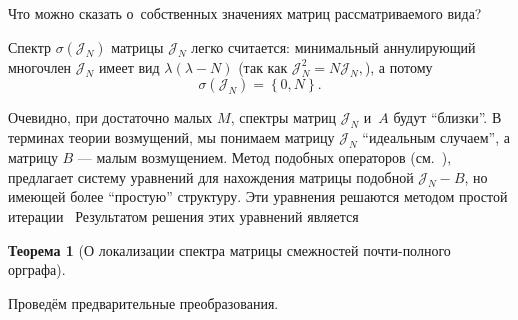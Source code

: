 \documentclass[14pt,a4paper]{extarticle}
\numberwithin{equation}{section}
\newtheorem{thm}{Теорема}
\theoremstyle{definition}
\begin{document}
Что можно сказать о~собственных значениях матриц рассматриваемого вида?

Спектр \( \sigma\left( \mathcal{J}_N \right) \)
 матрицы \( \mathcal{J}_N \) легко считается: минимальный аннулирующий
 многочлен \( \mathcal{J}_N \) имеет вид \( \lambda(\lambda - N) \) (так как \(
 \mathcal{J}_N^2 = N \mathcal{J}_N, \)), а потому
 \[ \sigma\left( \mathcal{J}_N \right) = \left\{ 0,N \right\}. \]

Очевидно, при достаточно малых \( M \),
спектры матриц \( \mathcal{J}_N \) и~\( A \) будут ``близки''.
В терминах теории возмущений, мы понимаем матрицу \( \mathcal{J}_N \)
``идеальным случаем'', а матрицу \( B \) --- малым возмущением.
Метод подобных операторов (см.~\cite{baskakov1986theorem,baskakov1987theorem,baskakov1994spectral,baskakov2002splitting}),
предлагает систему уравнений для нахождения матрицы подобной \( \mathcal{J}_N -
B \), но имеющей более ``простую'' структуру. Эти уравнения решаются методом
простой итерации~\cite{baskakov1986theorem,baskakov1987theorem,baskakov1994spectral,baskakov2002splitting}
Результатом решения этих уравнений
является
\begin{thm}[О локализации спектра матрицы смеж\-ностей
  почти-полного ор\-графа]\label{nk:thm:almost-all-ones}
  
\end{thm}

Провед\"ем предварительные преобразования.
\end{document}

